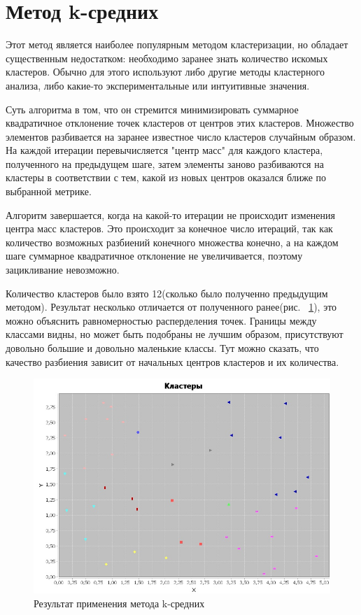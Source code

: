 \documentclass[a4paper,12pt]{article}
\begin{document}
\newpage\section{Метод k-средних}
Этот метод является наиболее популярным методом кластеризации, но обладает существенным недостатком: необходимо заранее знать количество искомых кластеров. Обычно для этого используют либо другие методы кластерного анализа, либо какие-то экспериментальные или интуитивные значения.

\vspace{0.5cm}
Суть алгоритма в том, что он стремится минимизировать суммарное квадратичное отклонение точек кластеров от центров этих кластеров. Множество элементов разбивается на заранее известное число кластеров случайным образом. На каждой итерации перевычисляется "центр масс" для каждого кластера, полученного на предыдущем шаге, затем элементы заново разбиваются на кластеры в соответствии с тем, какой из новых центров оказался ближе по выбранной метрике.

\vspace{0.5cm}
Алгоритм завершается, когда на какой-то итерации не происходит изменения центра масс кластеров. Это происходит за конечное число итераций, так как количество возможных разбиений конечного множества конечно, а на каждом шаге суммарное квадратичное отклонение не увеличивается, поэтому зацикливание невозможно.

\vspace{0.5cm}
Количество кластеров было взято 12(сколько было полученно предыдущим методом). Результат несколько отличается от полученного ранее(рис. ~\ref{fig:im_2}), это можно объяснить равномерностью расперделения точек. Границы между классами видны, но может быть подобраны не лучшим образом, присутствуют довольно большие и довольно маленькие классы. Тут можно сказать, что качество разбиения зависит от начальных центров кластеров и их количества.

\begin{center}
	\begin{figure}[h]
	\includegraphics[scale=0.8]{figure_2.png}
	\caption{Результат применения метода k-средних}
	\label{fig:im_2}
	\end{figure}
\end{center}
\end{document}
